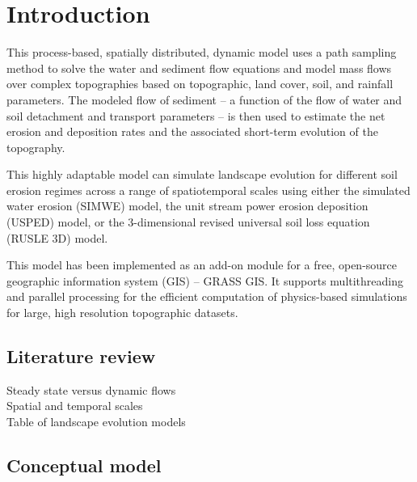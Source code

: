 \documentclass[final,3p,times,twocolumn]{elsarticle}
\begin{document}
\section{Introduction}
This process-based, spatially distributed, dynamic model uses a path sampling method to solve the water and sediment flow equations
\cite{mitasova2004}
and model mass flows over complex topographies based on topographic, land cover, soil, and rainfall parameters.
The modeled flow of sediment -- a function of the flow of water and soil detachment and transport parameters -- is then used to estimate the net erosion and deposition rates and the associated short-term evolution of the topography. 

This highly adaptable model can simulate landscape evolution 
for different soil erosion regimes
across a range of spatiotemporal scales
using either
the simulated water erosion (SIMWE) model, 
the unit stream power erosion deposition (USPED) model,
or the 3-dimensional revised universal soil loss equation (RUSLE 3D) model.  

This model has been implemented as an add-on module 
for a free, open-source geographic information system (GIS) -- GRASS GIS.
It supports multithreading and parallel processing
for the efficient computation of 
physics-based simulations for large, high resolution topographic datasets.



\subsection{Literature review}

Steady state versus dynamic flows \\

Spatial and temporal scales \\

Table of landscape evolution models \\

\subsection{Conceptual model}

\end{document}
